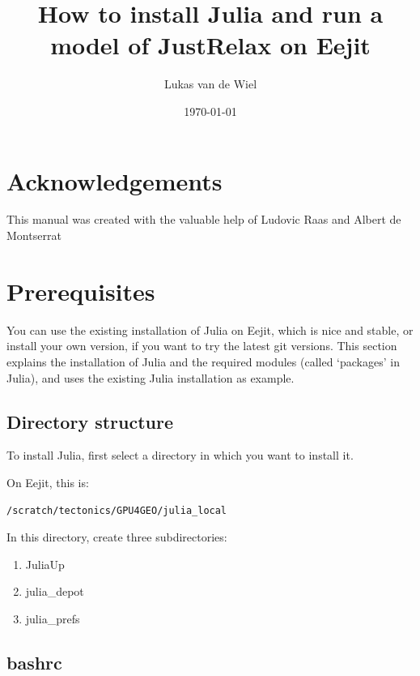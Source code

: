 \documentclass{article}
\begin{document}
\title{How to install Julia and run a model of JustRelax on Eejit}
\author{Lukas van de Wiel}
\date{\today}

\maketitle

\section{Acknowledgements}

This manual was created with the valuable help of Ludovic Raas and Albert de Montserrat

\section{Prerequisites}

You can use the existing installation of Julia on Eejit, which is nice and stable, 
or install your own version, if you want to try the latest git versions.
This section explains the installation of Julia and the required modules (called `packages' 
in Julia), and uses the existing Julia installation as example.

\subsection{Directory structure}

To install Julia, first select a directory in which you want to install it.

On Eejit, this is:
\begin{verbatim}
/scratch/tectonics/GPU4GEO/julia_local
\end{verbatim}

In this directory, create three subdirectories:

\begin{enumerate}
\item JuliaUp  
\item julia\_depot  
\item julia\_prefs
\end{enumerate}

\subsection{bashrc}
\end{document}
